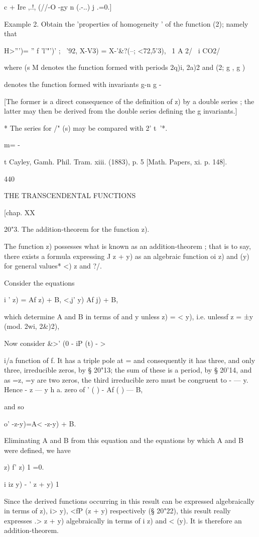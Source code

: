 {c + Ire ,.!, (//-O -gy n (.-..) j .=0.]

Example 2. Obtain the 'properties of homogeneity ' of the function
(2); namely that

 H>''')= '' f 'l'"')' ; ~'92, X-V3) = X-'\&?(--; <72,5'3), \ 1 A 2/ \
i CO2/

where (s M denotes the function formed with periods 2q)i, 2a)2 and (2;
g , g )

denotes the function formed with invariants g-n g -

[The former is a direct consequence of the definition of z) by a
double series ; the latter may then be derived from the double series
defining the g invariants.]

* The series for /" (s) may be compared with 2' t~'*.

m= -

t Cayley, Gamh. Phil. Tram. xiii. (1883), p. 5 [Math. Papers, xi. p.
148].

440

THE TRANSCENDENTAL FUNCTIONS

[chap. XX

20"3. The addition-theorem for the function z).

The function z) possesses what is known as an addition-theorem ; that
is to say, there exists a formula expressing J z + y) as an algebraic
function oi z) and (y) for general values* <) z and ?/.

Consider the equations

i ' z) = Af z) + B, <,j' y) Af j) + B,

which determine A and B in terms of and y unless z) = < y), i.e.
unlessf z = ±y (mod. 2wi, 2\&)2),

Now consider \&>' (0 - iP (t) - >

 i/a function of f. It has a triple pole at = and consequently it has
three, and only three, irreducible zeros, by § 20"13; the sum of these
is a period, by § 20'14, and as =z, =y are two zeros, the third
irreducible zero must be congruent to - — y. Hence - z — y h a. zero
of ' ( ) - Af ( ) — B,

and so

 o' -z-y)=A< -z-y) + B.

Eliminating A and B from this equation and the equations by which A
and B were defined, we have

  z) f' z) 1 =0.

i iz y) - ' z + y) 1

Since the derived functions occurring in this result can be expressed
algebraically in terms of z), i> y), <fP (z + y) respectively (§
20"22), this result really expresses .> z + y) algebraically in terms
of i z) and < (y). It is therefore an addition-theorem.

}
